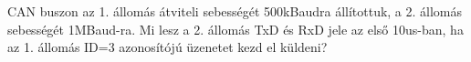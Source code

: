 \begin{example}

CAN buszon az 1. állomás átviteli sebességét 500kBaudra állítottuk, a 2. állomás sebességét 1MBaud-ra. Mi lesz a 2. állomás TxD és RxD jele az első 10us-ban, ha az 1. állomás ID=3 azonosítójú üzenetet kezd el küldeni?

\tcbline
\vspace{1mm}

\solution

\end{example}